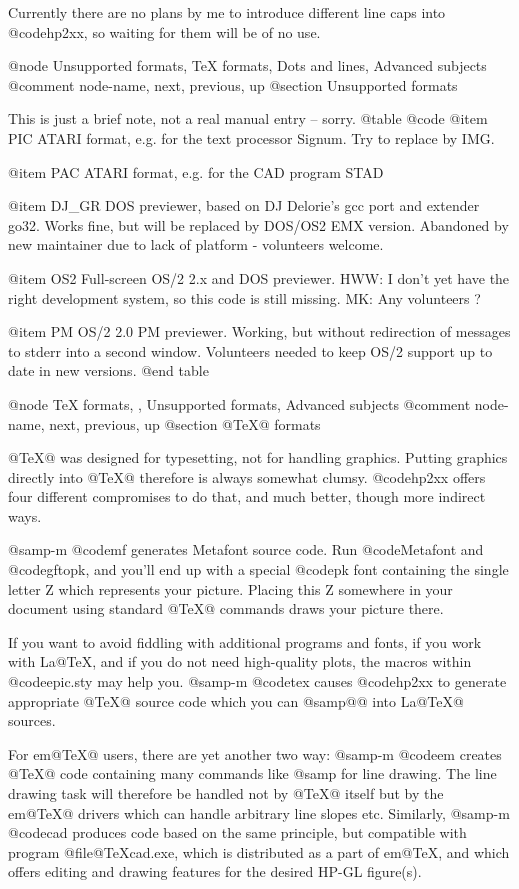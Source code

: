 Currently there are no plans by me to introduce different line caps
into @code{hp2xx}, so waiting for them will be of no use.




@node Unsupported formats, TeX formats, Dots and lines, Advanced subjects
@comment  node-name,  next,  previous,  up
@section Unsupported formats

This is just a brief note, not a real manual entry -- sorry.
@table @code
@item PIC
	ATARI format, e.g. for the text processor Signum. Try to replace by IMG.

@item PAC
	ATARI format, e.g. for the CAD program STAD

@item DJ_GR
	DOS previewer, based on DJ Delorie's gcc port and extender go32.
	Works fine, but will be replaced by DOS/OS2 EMX version.
	Abandoned by new maintainer due to lack of platform - volunteers
	welcome.

@item OS2
	Full-screen OS/2 2.x and DOS previewer. HWW: I don't yet have the
	right development system, so this code is still missing.
	MK: Any volunteers ?

@item PM
	OS/2 2.0 PM previewer. Working, but without redirection of
	messages to stderr into a second window. Volunteers needed to
	keep OS/2 support up to date in new versions.
@end table




@node TeX formats, , Unsupported formats, Advanced subjects
@comment  node-name,  next,  previous,  up
@section @TeX{}@  formats

@TeX{}@  was designed for typesetting, not for handling graphics. Putting
graphics directly into @TeX{}@  therefore is always somewhat clumsy.
@code{hp2xx} offers four different compromises to do that, and much
better, though more indirect ways.

@samp{-m @code{mf}} generates Metafont source code. Run @code{Metafont}
and @code{gftopk}, and you'll end up with a special @code{pk} font
containing the single letter Z which represents your picture. Placing
this Z somewhere in your document using standard @TeX{}@  commands
draws your picture there.

If you want to avoid fiddling with additional programs and fonts, if you
work with La@TeX{}, and if you do not need high-quality plots,
the macros within @code{epic.sty} may help you.
@samp{-m @code{tex}} causes @code{hp2xx} to generate
appropriate @TeX{}@ source code which you can @samp{@{@}} into
La@TeX{}@ sources.

For em@TeX{}@ users, there are yet another two way: @samp{-m @code{em}}
creates @TeX{}@ code containing many commands like @samp{}
for line drawing. The line drawing task will therefore be handled not by
@TeX{}@ itself but by the em@TeX{}@ drivers which can handle arbitrary
line slopes etc. Similarly, @samp{-m @code{cad}} produces code based on
the same principle, but compatible with program @file{@TeX{}cad.exe}, which is
distributed as a part of em@TeX{}, and which offers editing and drawing
features for the desired HP-GL figure(s).

